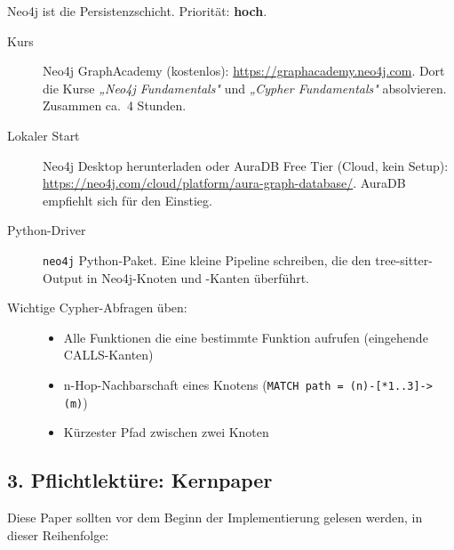 Neo4j ist die Persistenzschicht. Priorität: \textbf{hoch}.

\begin{description}
  \item[Kurs] Neo4j GraphAcademy (kostenlos): \url{https://graphacademy.neo4j.com}. Dort die Kurse \emph{„Neo4j Fundamentals"} und \emph{„Cypher Fundamentals"} absolvieren. Zusammen ca.\ 4 Stunden.

  \item[Lokaler Start] Neo4j Desktop herunterladen oder AuraDB Free Tier (Cloud, kein Setup): \url{https://neo4j.com/cloud/platform/aura-graph-database/}. AuraDB empfiehlt sich für den Einstieg.

  \item[Python-Driver] \texttt{neo4j} Python-Paket. Eine kleine Pipeline schreiben, die den tree-sitter-Output in Neo4j-Knoten und -Kanten überführt.

  \item[Wichtige Cypher-Abfragen üben:]
    \begin{itemize}
      \item Alle Funktionen die eine bestimmte Funktion aufrufen (eingehende CALLS-Kanten)
      \item n-Hop-Nachbarschaft eines Knotens (\texttt{MATCH path = (n)-[*1..3]->(m)})
      \item Kürzester Pfad zwischen zwei Knoten
    \end{itemize}
\end{description}

\subsection*{3. Pflichtlektüre: Kernpaper}

Diese Paper sollten vor dem Beginn der Implementierung gelesen werden, in dieser Reihenfolge:

